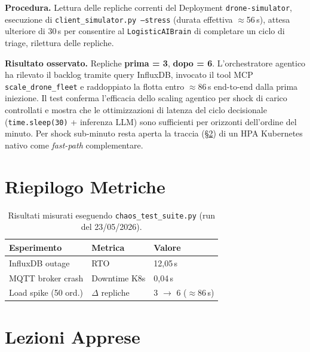 \textbf{Procedura.} Lettura delle repliche correnti del Deployment \texttt{drone-simulator}, esecuzione di \texttt{client\_simulator.py --stress} (durata effettiva $\approx$56\,s), attesa ulteriore di 30\,s per consentire al \texttt{LogisticAIBrain} di completare un ciclo di triage, rilettura delle repliche.

\textbf{Risultato osservato.} Repliche \textbf{prima = 3}, \textbf{dopo = 6}. L'orchestratore agentico ha rilevato il backlog tramite query InfluxDB, invocato il tool MCP \texttt{scale\_drone\_fleet} e raddoppiato la flotta entro $\approx$86\,s end-to-end dalla prima iniezione. Il test conferma l'efficacia dello scaling agentico per shock di carico controllati e mostra che le ottimizzazioni di latenza del ciclo decisionale (\texttt{time.sleep(30)} + inferenza LLM) sono sufficienti per orizzonti dell'ordine del minuto. Per shock sub-minuto resta aperta la traccia (§\ref{sec:lezioni_chaos}) di un HPA Kubernetes nativo come \emph{fast-path} complementare.

\section{Riepilogo Metriche}
\label{sec:riepilogo_chaos}

\begin{table}[ht]
\centering
\begin{tabular}{lll}
\toprule
\textbf{Esperimento} & \textbf{Metrica} & \textbf{Valore} \\
\midrule
InfluxDB outage      & RTO              & 12{,}05\,s \\
MQTT broker crash    & Downtime K8s     & 0{,}04\,s \\
Load spike (50 ord.) & $\Delta$ repliche & 3 $\rightarrow$ 6 ($\approx$86\,s) \\
\bottomrule
\end{tabular}
\caption{Risultati misurati eseguendo \texttt{chaos\_test\_suite.py} (run del 23/05/2026).}
\label{tab:chaos_results}
\end{table}

\section{Lezioni Apprese}
\label{sec:lezioni_chaos}

